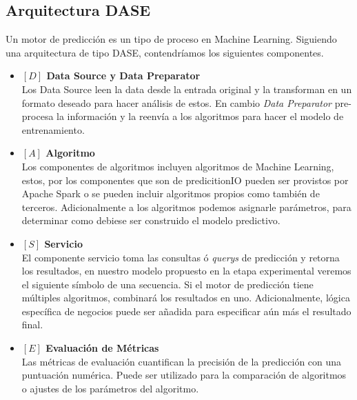 \subsection{Arquitectura DASE}


Un motor de predicción es un tipo de proceso en Machine Learning. Siguiendo una arquitectura de tipo {DASE}, contendríamos los siguientes componentes.



\begin{itemize}

  \item \textbf{ $[D]$ Data Source y Data Preparator }\\
  Los Data Source leen la data desde la entrada original y la transforman en un formato deseado para hacer análisis de estos. En cambio \emph{Data Preparator} pre-procesa la información y la reenvía a los algoritmos para   hacer el modelo de entrenamiento.


    \item \textbf{ $[A]$ Algoritmo}\\
  Los componentes de algoritmos incluyen algoritmos de Machine Learning, estos, por los componentes que son de predicitionIO pueden ser provistos por Apache Spark o se pueden incluir algoritmos propios como también de terceros.
  Adicionalmente a los algoritmos podemos asignarle parámetros, para determinar como debiese ser construido el modelo predictivo.



    \item \textbf{ $[S]$ Servicio}\\
    El componente servicio toma las consultas ó \emph{querys} de predicción y retorna los resultados, en nuestro modelo propuesto en la etapa experimental veremos el siguiente símbolo de una secuencia. 
    Si el motor de predicción tiene múltiples algoritmos, combinará los resultados en uno. Adicionalmente, lógica específica de negocios puede ser añadida para especificar aún más el resultado final. 
 
    \item \textbf{ $[E]$ Evaluación de Métricas}\\
Las métricas de evaluación cuantifican la precisión de la predicción con una puntuación numérica. Puede ser utilizado para la comparación de algoritmos o ajustes de los parámetros del algoritmo.


\end{itemize}




